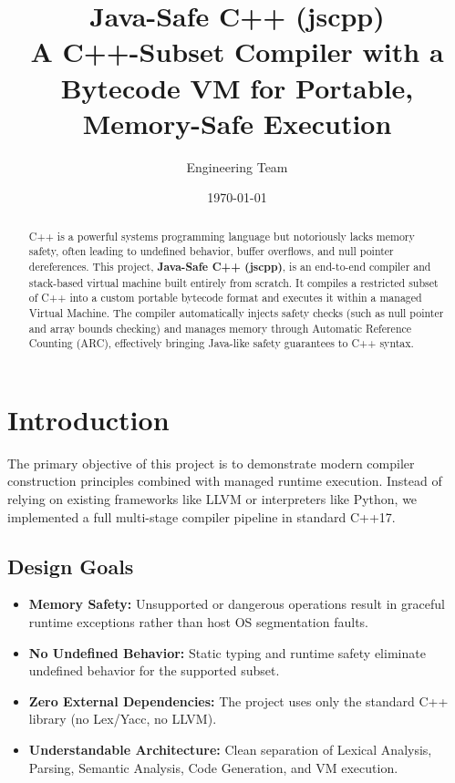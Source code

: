 \documentclass[12pt, a4paper]{article}
\title{\textbf{Java-Safe C++ (jscpp)}\\ \large A C++-Subset Compiler with a Bytecode VM for Portable, Memory-Safe Execution}
\author{Engineering Team}
\date{\today}
\begin{document}
\maketitle

\begin{abstract}
C++ is a powerful systems programming language but notoriously lacks memory safety, often leading to undefined behavior, buffer overflows, and null pointer dereferences. This project, \textbf{Java-Safe C++ (jscpp)}, is an end-to-end compiler and stack-based virtual machine built entirely from scratch. It compiles a restricted subset of C++ into a custom portable bytecode format and executes it within a managed Virtual Machine. The compiler automatically injects safety checks (such as null pointer and array bounds checking) and manages memory through Automatic Reference Counting (ARC), effectively bringing Java-like safety guarantees to C++ syntax.
\end{abstract}

\tableofcontents
\newpage

\section{Introduction}
The primary objective of this project is to demonstrate modern compiler construction principles combined with managed runtime execution. Instead of relying on existing frameworks like LLVM or interpreters like Python, we implemented a full multi-stage compiler pipeline in standard C++17. 

\subsection{Design Goals}
\begin{itemize}
    \item \textbf{Memory Safety:} Unsupported or dangerous operations result in graceful runtime exceptions rather than host OS segmentation faults.
    \item \textbf{No Undefined Behavior:} Static typing and runtime safety eliminate undefined behavior for the supported subset.
    \item \textbf{Zero External Dependencies:} The project uses only the standard C++ library (no Lex/Yacc, no LLVM).
    \item \textbf{Understandable Architecture:} Clean separation of Lexical Analysis, Parsing, Semantic Analysis, Code Generation, and VM execution.
\end{itemize}
\end{document}

